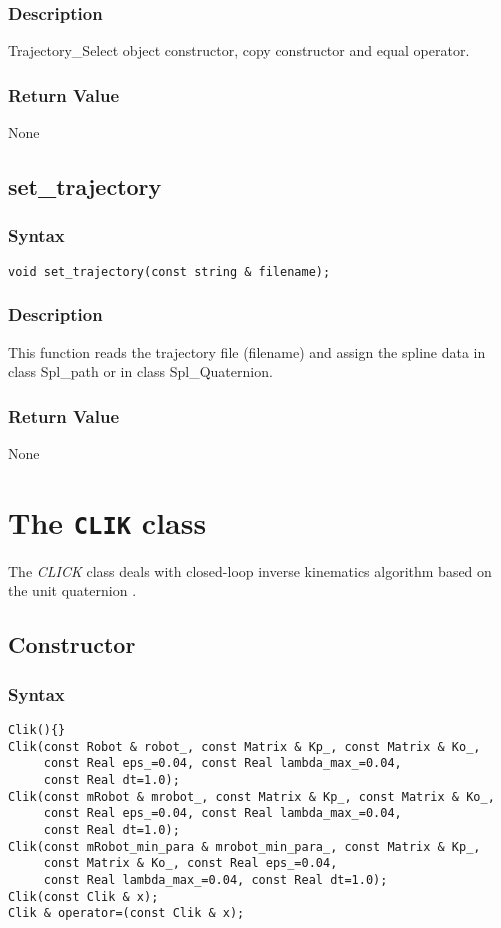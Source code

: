 \documentclass[dvips,11pt,fleqn]{report}
\begin{document}
\subsubsection*{Description}   
Trajectory\_Select object constructor, copy constructor and equal operator.

\subsubsection*{Return Value}

None

\newpage

\subsection*{set\_trajectory}
\subsubsection*{Syntax}
\begin{verbatim}
void set_trajectory(const string & filename);
\end{verbatim}

\subsubsection*{Description}   
This function reads the trajectory file (filename) and 
assign the spline data in class Spl\_path or in class
Spl\_Quaternion.

\subsubsection*{Return Value}

None

\newpage

\section{The \texttt{CLIK} class}

The \emph{CLICK} class deals with closed-loop inverse kinematics
algorithm based on the unit quaternion \cite{Chiaverini99}.

\subsection*{Constructor}
\subsubsection*{Syntax}
\begin{verbatim}
Clik(){}
Clik(const Robot & robot_, const Matrix & Kp_, const Matrix & Ko_, 
     const Real eps_=0.04, const Real lambda_max_=0.04, 
     const Real dt=1.0);
Clik(const mRobot & mrobot_, const Matrix & Kp_, const Matrix & Ko_, 
     const Real eps_=0.04, const Real lambda_max_=0.04, 
     const Real dt=1.0);
Clik(const mRobot_min_para & mrobot_min_para_, const Matrix & Kp_, 
     const Matrix & Ko_, const Real eps_=0.04, 
     const Real lambda_max_=0.04, const Real dt=1.0);
Clik(const Clik & x);
Clik & operator=(const Clik & x);
\end{verbatim}
\end{document}
